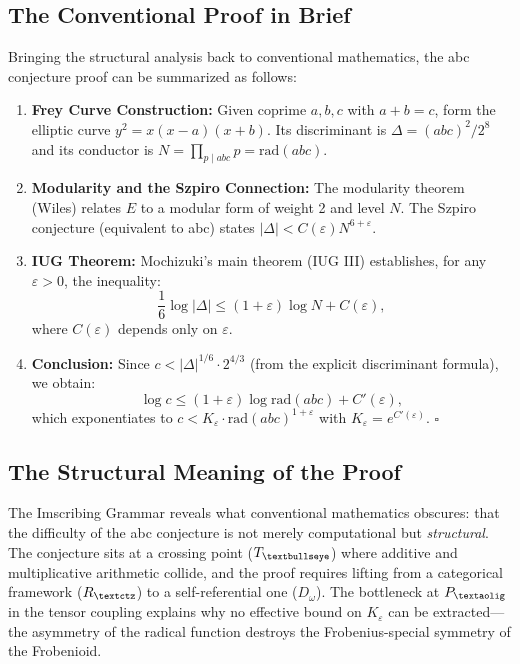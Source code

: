 \documentclass[12pt]{article}
\newcommand{\aolig}{\text{\textaolig}}
\newcommand{\igbullseye}{\text{\textbullseye}}
\newcommand{\ctz}{\text{\textctz}}
\begin{document}
\subsection{The Conventional Proof in Brief}

Bringing the structural analysis back to conventional mathematics, the abc conjecture proof can be summarized as follows:

\begin{enumerate}
\item \textbf{Frey Curve Construction:} Given coprime $a, b, c$ with $a + b = c$, form the elliptic curve $y^2 = x(x-a)(x+b)$. Its discriminant is $\Delta = (abc)^2/2^8$ and its conductor is $N = \prod_{p \mid abc} p = \text{rad}(abc)$.

\item \textbf{Modularity and the Szpiro Connection:} The modularity theorem (Wiles) relates $E$ to a modular form of weight 2 and level $N$. The Szpiro conjecture (equivalent to abc) states $|\Delta| < C(\varepsilon) N^{6+\varepsilon}$.

\item \textbf{IUG Theorem:} Mochizuki's main theorem (IUG III) establishes, for any $\varepsilon > 0$, the inequality:
\begin{equation}
\frac{1}{6} \log |\Delta| \leq (1+\varepsilon) \log N + C(\varepsilon),
\end{equation}
where $C(\varepsilon)$ depends only on $\varepsilon$.

\item \textbf{Conclusion:} Since $c < |\Delta|^{1/6} \cdot 2^{4/3}$ (from the explicit discriminant formula), we obtain:
\begin{equation}
\log c \leq (1+\varepsilon) \log \text{rad}(abc) + C'(\varepsilon),
\end{equation}
which exponentiates to $c < K_\varepsilon \cdot \text{rad}(abc)^{1+\varepsilon}$ with $K_\varepsilon = e^{C'(\varepsilon)}$. $\square$
\end{enumerate}

\subsection{The Structural Meaning of the Proof}

The Imscribing Grammar reveals what conventional mathematics obscures: that the difficulty of the abc conjecture is not merely computational but \textit{structural}. The conjecture sits at a crossing point ($T_{\igbullseye}$) where additive and multiplicative arithmetic collide, and the proof requires lifting from a categorical framework ($R_{\ctz}$) to a self-referential one ($D_\omega$). The bottleneck at $P_{\aolig}$ in the tensor coupling explains why no effective bound on $K_\varepsilon$ can be extracted---the asymmetry of the radical function destroys the Frobenius-special symmetry of the Frobenioid.
\end{document}
